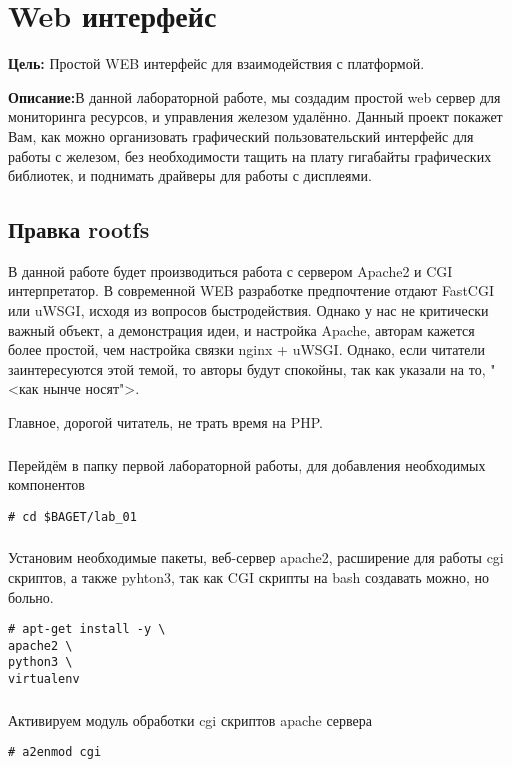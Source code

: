 \chapter{Web интерфейс}
\textbf{Цель:} Простой WEB интерфейс для взаимодействия с платформой.

\vspace{5mm}
\textbf{Описание:}В данной лабораторной работе, мы создадим простой web сервер для мониторинга ресурсов, и управления железом удалённо. Данный проект покажет Вам, как можно организовать графический пользовательский интерфейс для работы с железом, без необходимости тащить на плату гигабайты графических библиотек, и поднимать драйверы для работы с дисплеями.  

\section{Правка rootfs}

В данной работе будет производиться работа с сервером Apache2 и CGI интерпретатор. В современной WEB разработке предпочтение отдают FastCGI или uWSGI, исходя из вопросов быстродействия. Однако у нас не критически важный объект, а демонстрация идеи, и настройка Apache, авторам кажется более простой, чем настройка связки nginx + uWSGI. Однако, если читатели заинтересуются этой темой, то авторы будут спокойны, так как указали на то, "<как нынче носят">. 

Главное, дорогой читатель, не трать время на PHP.    

\subsection{}Перейдём в папку первой лабораторной работы, для добавления необходимых компонентов
\begin{lstlisting}[style=bash]
# cd $BAGET/lab_01
\end{lstlisting}


\subsection{}Установим необходимые пакеты, веб-сервер apache2, расширение для работы cgi скриптов, а также pyhton3, так как CGI скрипты на bash создавать можно, но больно.
\begin{lstlisting}[style=bash]
# apt-get install -y \
apache2 \
python3 \
virtualenv
\end{lstlisting}

\subsection{}Активируем модуль обработки cgi скриптов apache сервера
\begin{lstlisting}[style=bash]
# a2enmod cgi
\end{lstlisting}

